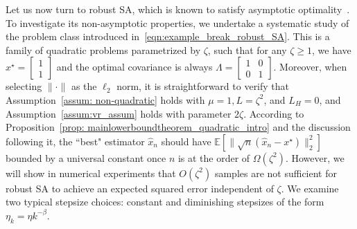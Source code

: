 \documentclass[11pt,twoside]{article}
\numberwithin{equation}{section}
\newcommand{\EE}{\mathbb{E}}
\newcommand{\1}{\mathbf{1}}
\theoremstyle{remark}
\theoremstyle{plain}
\newcommand{\liph}{L_H}
\begin{document}
Let us now turn to robust SA, which is known to satisfy asymptotic optimality~\cite{polyak1992acceleration,duchi2021asymptotic}. To investigate its non-asymptotic properties, we undertake a systematic study of the problem class introduced in~\eqref{eqn:example_break_robust_SA}. 
This is a family of quadratic problems parametrized by $\zeta$, such that for any $\zeta \ge 1$, we have $ x^\star = \begin{bmatrix}
1\\
1
\end{bmatrix}$ and the optimal covariance is always  $\Lambda = \begin{bmatrix}
1 & 0\\
0&  1
\end{bmatrix}$. Moreover, when selecting $\|\cdot\|$ as the $\ell_2$ norm, it is straightforward to verify that Assumption~\ref{assum: non-quadratic} holds with $\mu=1, L = \zeta^2$, and $\liph = 0$, and Assumption~\ref{assum:vr_assum} holds with parameter $2\zeta$.
According to Proposition~\ref{prop: mainlowerboundtheorem_quadratic_intro} and the discussion following it, the ``best" estimator $\widehat x_n$  should have $\EE[\|\sqrt{n}(\widehat x_n -x^\star)\|_2^2]$ bounded by a universal constant once $n$ is at the order of $ \Omega(\zeta^2)$.
However,  we will show in numerical experiments that $O(\zeta^2)$ samples are not sufficient for robust SA to achieve an expected squared error independent of $\zeta$. We examine two typical stepsize choices: constant and diminishing stepsizes of the form $\eta_k = \eta k^{-\beta}$.
\end{document}
